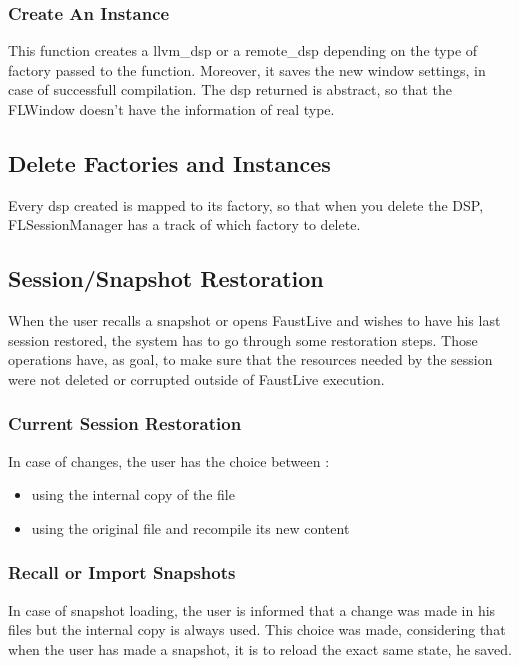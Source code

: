 \documentclass[a4paper]{article}
\begin{document}
\subsubsection{Create An Instance}

This function creates a llvm\_dsp or a remote\_dsp depending on the type of factory passed to the function. Moreover, it saves the new window settings, in case of successfull compilation. The dsp returned is abstract, so that the FLWindow doesn't have the information of real type. 

\subsection{Delete Factories and Instances}

Every dsp created is mapped to its factory, so that when you delete the DSP, FLSessionManager has a track of which factory to delete. 

\subsection{Session/Snapshot Restoration}

When the user recalls a snapshot or opens FaustLive and wishes to have his last session restored, the system has to go through some restoration steps. Those operations have, as goal, to make sure that the resources needed by the session were not deleted or corrupted outside of FaustLive execution. 

\subsubsection{Current Session Restoration}

In case of changes, the user has the choice between : 
\begin{itemize}
\item using the internal copy of the file
\item using the original file and recompile its new content
\end{itemize}

\subsubsection{Recall or Import Snapshots}

In case of snapshot loading, the user is informed that a change was made in his files but the internal copy is always used. This choice was made, considering that when the user has made a snapshot, it is to reload the exact same state, he saved. 
\end{document}
